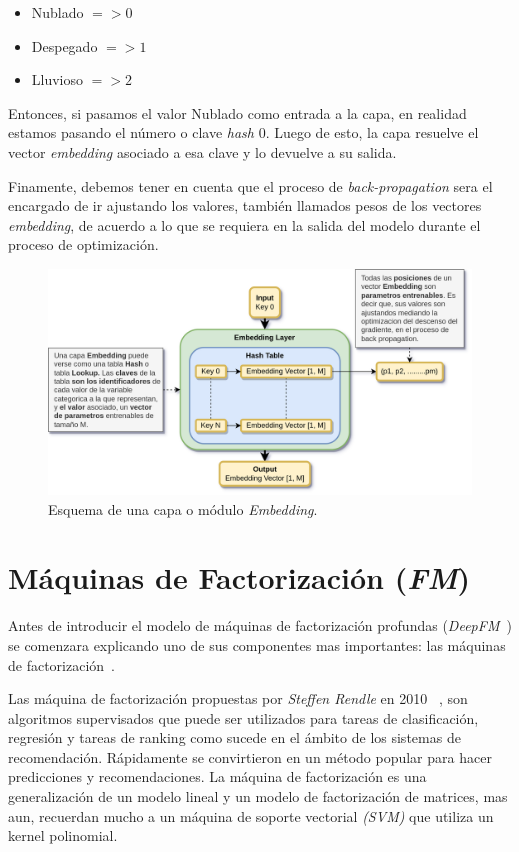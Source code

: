 \documentclass[11pt,a4paper,twoside]{thesis}
\begin{document}
\begin{itemize}
	\item Nublado $=> 0$
	\item Despegado $=> 1$
	\item Lluvioso $=> 2$
\end{itemize}

Entonces, si pasamos el valor Nublado como entrada a la capa, en realidad
estamos pasando el número o clave \textit{hash} $0$. Luego de esto, la capa
resuelve el vector \textit{embedding} asociado a esa clave y lo devuelve a su
salida.

Finamente, debemos tener en cuenta que el proceso de \textit{back-propagation}
sera el encargado de ir ajustando los valores, también llamados pesos de los
vectores \textit{embedding}, de acuerdo a lo que se requiera en la salida del
modelo durante el proceso de optimización.

\begin{figure}[ht!]
	\centering
	\includegraphics[width=13cm]{./images/Embedding-Layer.png}
	\caption{Esquema de una capa o módulo \textit{Embedding}.}
	\label{fig:embeddingLayer}
\end{figure}

\clearpage



\section{Máquinas de Factorización (\textit{FM})}

Antes de introducir el modelo de máquinas de factorización profundas
(\textit{DeepFM}~\cite{dfmpaper, didldfm}) se comenzara explicando uno de sus componentes mas
importantes: las máquinas de factorización~\cite{didlfm, zhangdive}.

Las máquina de factorización propuestas por \textit{Steffen Rendle} en 2010
~\cite{fm}, son algoritmos supervisados que puede ser utilizados para tareas de
clasificación, regresión y tareas de ranking como sucede en el ámbito de los
sistemas de recomendación. Rápidamente se convirtieron en un método popular
para hacer predicciones y recomendaciones. La máquina de factorización es una
generalización de un modelo lineal y un modelo de factorización de matrices, mas
aun, recuerdan mucho a un máquina de soporte vectorial \textit{(SVM)} que
utiliza un kernel polinomial.
\end{document}
